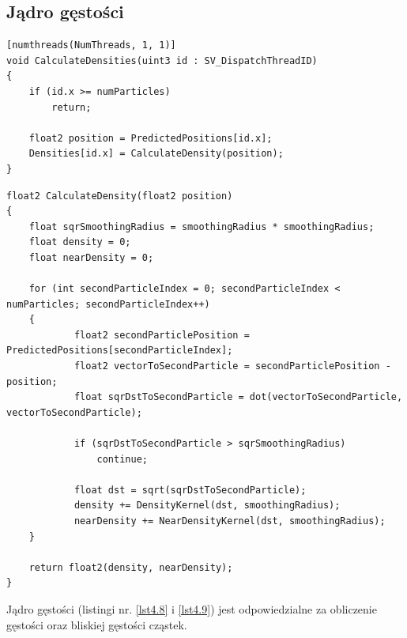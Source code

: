 \documentclass{article}
\begin{document}
\subsection{Jądro gęstości}
\begin{lstlisting}[caption=Jądro gęstości, label={lst4.8}]
[numthreads(NumThreads, 1, 1)]
void CalculateDensities(uint3 id : SV_DispatchThreadID)
{
	if (id.x >= numParticles)
		return;

	float2 position = PredictedPositions[id.x];
	Densities[id.x] = CalculateDensity(position);
}
\end{lstlisting}
\newpage
\begin{lstlisting}[caption=Ciało funkcji CalculateDensity(), label={lst4.9}]
float2 CalculateDensity(float2 position)
{
	float sqrSmoothingRadius = smoothingRadius * smoothingRadius;
	float density = 0;
	float nearDensity = 0;

	for (int secondParticleIndex = 0; secondParticleIndex < numParticles; secondParticleIndex++)
	{
			float2 secondParticlePosition = PredictedPositions[secondParticleIndex];
			float2 vectorToSecondParticle = secondParticlePosition - position;
			float sqrDstToSecondParticle = dot(vectorToSecondParticle, vectorToSecondParticle);

			if (sqrDstToSecondParticle > sqrSmoothingRadius)
				continue;

			float dst = sqrt(sqrDstToSecondParticle);
			density += DensityKernel(dst, smoothingRadius);
			nearDensity += NearDensityKernel(dst, smoothingRadius);
	}

	return float2(density, nearDensity);
}
\end{lstlisting}
\noindent
Jądro gęstości (listingi nr. \ref{lst4.8} i \ref{lst4.9}) jest odpowiedzialne za obliczenie gęstości oraz bliskiej gęstości cząstek.\newline
\end{document}

